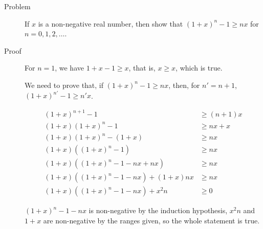 \begin{description}
\item[Problem] If $x$ is a non-negative real number, then show that $(1 + x)^n
- 1 \ge nx$ for $n = 0, 1, 2, \dots$.

\item[Proof] For $n = 1$, we have $1 + x - 1 \ge x$, that is, $x \ge x$, which
is true.

We need to prove that, if $(1 + x)^n - 1 \ge nx$, then, for $n' = n + 1$,
$(1 + x)^{n'} - 1 \ge n' x$.

\begin{align*}
(1 + x)^{n + 1} - 1 &\ge (n + 1) x \\
(1 + x) (1 + x)^n - 1 &\ge n x + x \\
(1 + x) (1 + x)^n - (1 + x) &\ge n x \\
(1 + x) \left((1 + x)^n - 1\right) &\ge n x \\
(1 + x) \left((1 + x)^n - 1 - n x + n x\right) &\ge n x \\
(1 + x) \left((1 + x)^n - 1 - n x\right) + (1 + x) n x &\ge n x \\
(1 + x) \left((1 + x)^n - 1 - n x\right) + x^2 n &\ge 0
\end{align*}

$(1 + x)^n - 1 - nx$ is non-negative by the induction hypothesis, $x^2 n$ and
$1 + x$ are non-negative by the ranges given, so the whole statement is true.

\end{description}
